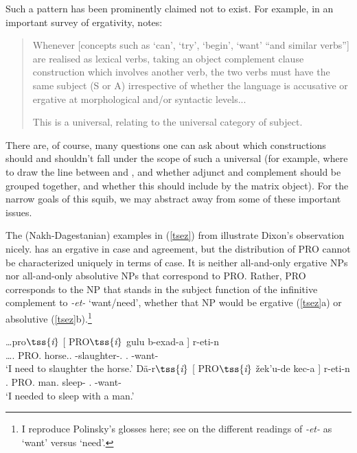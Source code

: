 \documentclass[output=paper]{langsci/langscibook}
\begin{document}
\ea \label{abscntr} 	\nobreak\begin{xlista}
	\end{xlista}
\z

Such a pattern has been prominently claimed not to exist. For example, in an
important survey of ergativity, \citet[134--135]{Dixon1994} notes:

\begin{quote} Whenever [concepts such as `can', `try', `begin', `want' ``and
    similar verbs''] are realised as lexical verbs, taking an object complement
    clause construction which involves another verb, the two verbs must have
    the same subject (S or A) irrespective of whether the language is
    accusative or ergative at morphological and/or syntactic levels...

    This is a universal, relating to the universal category of subject.
\end{quote}

There are, of course, many questions one can ask about which constructions
should and shouldn't fall under the scope of such a universal (for example,
where to draw the line between  and , and whether adjunct 
and complement  should be grouped together, and whether this should
include  by the matrix object). For the narrow goals of this squib, we
may abstract away from some of these important issues.

The  (Nakh-Dagestanian) examples in (\ref{tsez}) from
\cite[319]{polinsky16} illustrate Dixon's observation nicely.  has an
ergative  in case and agreement, but the distribution of PRO{} cannot
be characterized uniquely in terms of case. It is neither all-and-only
ergative
NPs nor all-and-only absolutive NPs that correspond to PRO. Rather, PRO
corresponds to the NP that stands in the subject function of the infinitive
complement to \emph{-et-} `want/need', whether that NP would be
ergative
(\ref{tsez}a) or absolutive (\ref{tsez}b).\footnote{I reproduce Polinsky's
glosses here; see \citet[319]{polinsky16} on the different readings of
\emph{-et-} as `want' versus `need'.}

\ea \label{tsez} 
	\begin{xlista}
	\ex \gll \ldots pro$\tss{\emph{i}}$ [ PRO$\tss{\emph{i}}$ gulu b-exad-a ] r-eti-n \\
	\ldots \Fsg.\Lat{} {} PRO.\Erg{} horse.\Abs.\Iii{} \Iii{}-slaughter-.\Inf{} {}.\Iv{} \Iv{}-want-\Nw{}\\
	\glt `I need to slaughter the horse.'
	\ex \gll D\"a-r$\tss{\emph{i}}$ [ PRO$\tss{\emph{i}}$ \v{z}ek'u-de kec-a ] r-eti-n \\
	\Fsg.\Lat{} {} PRO.\Abs{} man.\Apud{} sleep-\Inf{} {}.\Iv{} \Iv{}-want-\Nw{} \\
	\glt `I needed to sleep with a man.'
	\end{xlista}
\z
\end{document}
